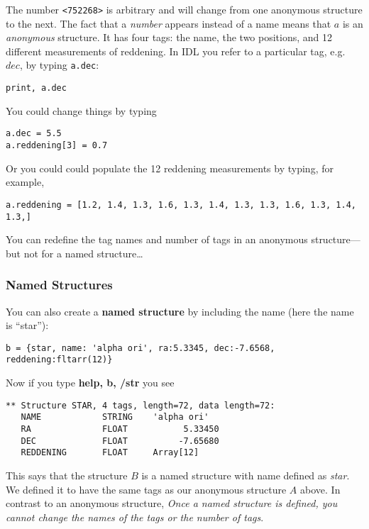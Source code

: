 \documentclass[psfig,preprint]{aastex}
\begin{document}
\noindent The number \verb$<752268>$ is arbitrary and will change from
one anonymous structure to the next. The fact that a {\it number} appears
instead of a name means that $a$ is an {\it anonymous} structure. It
has four tags: the name, the two positions, and 12 different measurements
of reddening.  In IDL you refer to a particular tag, e.g.\ $dec$,
by typing {\tt a.dec}:

\begin{verbatim}
print, a.dec
\end{verbatim}

\noindent You could change things by typing

\begin{verbatim}
a.dec = 5.5
a.reddening[3] = 0.7
\end{verbatim}

\noindent Or you could could populate the 12
reddening measurements by typing, for example,

\begin{verbatim}
a.reddening = [1.2, 1.4, 1.3, 1.6, 1.3, 1.4, 1.3, 1.3, 1.6, 1.3, 1.4, 1.3,]
\end{verbatim}

You can redefine the tag names and number of tags in an
anonymous structure---but not for a named structure\dots

\subsubsection{Named Structures}

You can also create a {\bf named structure} by including the
name (here the name is ``star''):

\begin{verbatim}
b = {star, name: 'alpha ori', ra:5.3345, dec:-7.6568, reddening:fltarr(12)} 
\end{verbatim}

\noindent Now if you type {\bf help, b, /str} you see

\begin{verbatim}
** Structure STAR, 4 tags, length=72, data length=72:
   NAME            STRING    'alpha ori'
   RA              FLOAT           5.33450
   DEC             FLOAT          -7.65680
   REDDENING       FLOAT     Array[12]
\end{verbatim}

\noindent This says that the structure $B$ is a named structure with
name defined as {\it star}. We defined it to have the same tags as our
anonymous structure $A$ above. In contrast to an anonymous structure,
{\it Once a named structure is defined, you cannot change the names of
  the tags or the number of tags}.
\end{document}
